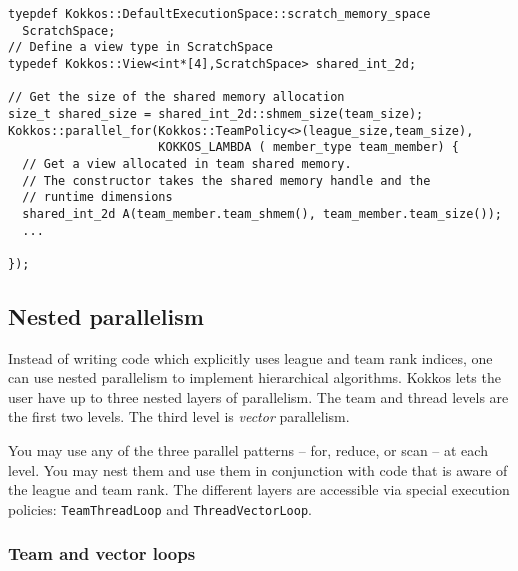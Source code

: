 \begin{lstlisting}
tyepdef Kokkos::DefaultExecutionSpace::scratch_memory_space
  ScratchSpace;
// Define a view type in ScratchSpace
typedef Kokkos::View<int*[4],ScratchSpace> shared_int_2d;

// Get the size of the shared memory allocation
size_t shared_size = shared_int_2d::shmem_size(team_size);
Kokkos::parallel_for(Kokkos::TeamPolicy<>(league_size,team_size),
                     KOKKOS_LAMBDA ( member_type team_member) {
  // Get a view allocated in team shared memory.
  // The constructor takes the shared memory handle and the 
  // runtime dimensions
  shared_int_2d A(team_member.team_shmem(), team_member.team_size());
  ...
      
});
\end{lstlisting}

\subsection{Nested parallelism}\label{S:Hierarchical:Nested}

Instead of writing code which explicitly uses league and team rank indices, one can use nested parallelism to implement hierarchical algorithms.
Kokkos lets the user have up to three nested layers of parallelism.
The team and thread levels are the first two levels.
The third level is \emph{vector} parallelism.

You may use any of the three parallel patterns -- for, reduce, or scan -- at each level.
You may nest them and use them in conjunction with code that is aware of the league and team rank.
The different layers are accessible via special execution policies:
\lstinline|TeamThreadLoop| and \lstinline|ThreadVectorLoop|. 

\subsubsection{Team and vector loops}\label{SS:Hierarchical:Nested:Loops}

